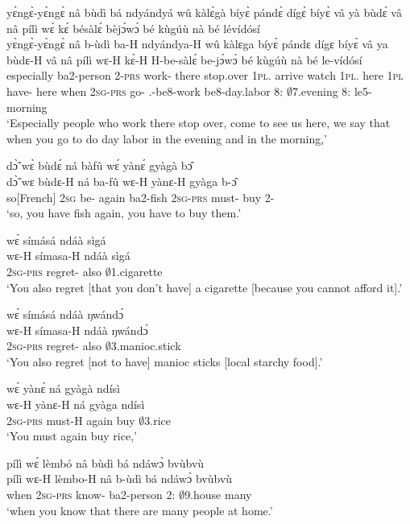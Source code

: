 \begin{exe}[(C234)] 
\exC\label{234} 
  \glll  yɛ̀ngɛ̀-yɛ̀ngɛ̀ nâ bùdì bá ndyándyá wû kàlɛ̀gà bíyɛ̀ pándɛ̀ dígɛ̀ bíyɛ̀ vâ yà bùdɛ́ vâ nâ pílì wɛ́ kɛ́ bésàlɛ́ bèjɔ́wɔ̀ bé kùgúù nà bé lévídósí\\
      yɛ̀ngɛ̀-yɛ̀ngɛ̀ nâ b-ùdì ba-H ndyándya-H wû kàlɛga bíyɛ̀ pándɛ dígɛ bíyɛ̀ vâ ya bùdɛ-H vâ nâ pílì wɛ-H kɛ̀-H H-be-sàlɛ́ be-jɔ́wɔ̀ bé kùgúù nà bé le-vídósí\\
       especially {\COMP} ba2-person 2-\textsc{prs} work-{\R} there stop.over 1\textsc{pl}.{\OBJ} arrive watch 1\textsc{pl}.{\OBJ} here 1\textsc{pl} have-{\R} here {\COMP} when 2\textsc{sg}-\textsc{prs} go-{\R} {\OBJ}.{\LINK}-be8-work be8-day.labor 8:{\ATT}  $\emptyset$7.evening {\CONJ} 8:{\ATT}  le5-morning\\
    \trans `Especially people who work there stop over, come to see us here, we say that when you go to do day labor in the evening and in the morning,'
 
\exC\label{235} 
  \glll  dɔ̃̀ wɛ̀ bùdɛ́ ná bàfû wɛ́ yànɛ́ gyàgà bɔ̂ \\
       dɔ̃̀ wɛ bùdɛ-H ná ba-fû wɛ-H yànɛ-H gyàga b-ɔ̂ \\
        so[French] 2\textsc{sg} be-{\R} again ba2-fish 2\textsc{sg}-\textsc{prs} must-{\R} buy 2-{\OBJ}  \\
    \trans `so, you have fish again, you have to buy them.'
 
\exC\label{236} 
  \glll wɛ́ símásá ndáà sìgá \\
        wɛ-H símasa-H ndáà sìgá \\
        2\textsc{sg}-\textsc{prs} regret-{\R} also $\emptyset$1.cigarette \\
    \trans `You also regret [that you don't have] a cigarette [because you cannot afford it].'
 
\exC\label{237}
  \glll  wɛ́ símásá ndáà ŋwándɔ́ \\
       wɛ-H símasa-H ndáà ŋwándɔ́ \\
       2\textsc{sg}-\textsc{prs} regret-{\R} also $\emptyset$3.manioc.stick   \\
    \trans `You also regret [not to have] manioc sticks [local starchy food].'
 
\exC\label{238} 
  \glll  wɛ́ yànɛ́ ná gyàgà ndísì \\
     wɛ-H yànɛ-H ná gyàga ndísì \\
        2\textsc{sg}-\textsc{prs} must-H again buy $\emptyset$3.rice  \\
    \trans `You must again buy rice,'
 
\exC\label{239} 
  \glll pílì wɛ́ lèmbó nâ bùdì bá ndáwɔ̀ bvùbvù \\
      pílì wɛ-H lèmbo-H nâ b-ùdì bá ndáwɔ̀ bvùbvù \\
        when 2\textsc{sg}-\textsc{prs} know-{\R} {\COMP} ba2-person 2:{\ATT}  $\emptyset$9.house many  \\
    \trans `when you know that there are many people at home.'
\end{exe}

